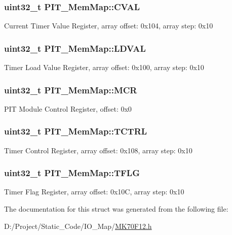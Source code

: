 \subsubsection[{C\+V\+A\+L}]{\setlength{\rightskip}{0pt plus 5cm}uint32\+\_\+t P\+I\+T\+\_\+\+Mem\+Map\+::\+C\+V\+A\+L}\label{struct_p_i_t___mem_map_a7d3d1a5913a28cfb4ca0e120ebf37087}
Current Timer Value Register, array offset\+: 0x104, array step\+: 0x10 \hypertarget{struct_p_i_t___mem_map_ad664bbe0f8b53ee1e533727db4da3fb2}{}
\subsubsection[{L\+D\+V\+A\+L}]{\setlength{\rightskip}{0pt plus 5cm}uint32\+\_\+t P\+I\+T\+\_\+\+Mem\+Map\+::\+L\+D\+V\+A\+L}\label{struct_p_i_t___mem_map_ad664bbe0f8b53ee1e533727db4da3fb2}
Timer Load Value Register, array offset\+: 0x100, array step\+: 0x10 \hypertarget{struct_p_i_t___mem_map_a99390c5764693e07c37d40ead441a7a4}{}
\subsubsection[{M\+C\+R}]{\setlength{\rightskip}{0pt plus 5cm}uint32\+\_\+t P\+I\+T\+\_\+\+Mem\+Map\+::\+M\+C\+R}\label{struct_p_i_t___mem_map_a99390c5764693e07c37d40ead441a7a4}
P\+I\+T Module Control Register, offset\+: 0x0 \hypertarget{struct_p_i_t___mem_map_a567cdea5c7d615341f95f1438020a7e1}{}
\subsubsection[{T\+C\+T\+R\+L}]{\setlength{\rightskip}{0pt plus 5cm}uint32\+\_\+t P\+I\+T\+\_\+\+Mem\+Map\+::\+T\+C\+T\+R\+L}\label{struct_p_i_t___mem_map_a567cdea5c7d615341f95f1438020a7e1}
Timer Control Register, array offset\+: 0x108, array step\+: 0x10 \hypertarget{struct_p_i_t___mem_map_add88e740d4ec7a83e66cf9ad79cd027a}{}
\subsubsection[{T\+F\+L\+G}]{\setlength{\rightskip}{0pt plus 5cm}uint32\+\_\+t P\+I\+T\+\_\+\+Mem\+Map\+::\+T\+F\+L\+G}\label{struct_p_i_t___mem_map_add88e740d4ec7a83e66cf9ad79cd027a}
Timer Flag Register, array offset\+: 0x10\+C, array step\+: 0x10 

The documentation for this struct was generated from the following file\+:\begin{DoxyCompactItemize}
\item 
D\+:/\+Project/\+Static\+\_\+\+Code/\+I\+O\+\_\+\+Map/\hyperlink{_m_k70_f12_8h}{M\+K70\+F12.\+h}\end{DoxyCompactItemize}
